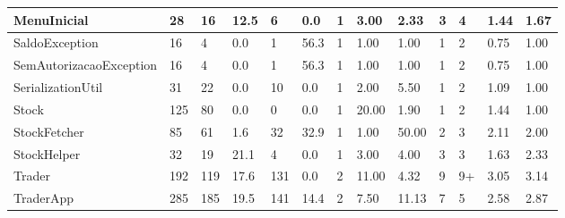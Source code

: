 \begin{table}[ht]
\begin{adjustbox}{width=1\textwidth}
\begin{tabular}{|l|l|l|l|l|l|l|l|l|l|l|l|l|}
MenuInicial                  & 28           & 16         & 12.5            & 6        & 0.0            & 1       & 3.00            & 2.33                       & 3                   & 4                   & 1.44               & 1.67               \\ \hline
SaldoException               & 16           & 4          & 0.0             & 1        & 56.3           & 1       & 1.00            & 1.00                       & 1                   & 2                   & 0.75               & 1.00               \\ \hline
SemAutorizacaoException      & 16           & 4          & 0.0             & 1        & 56.3           & 1       & 1.00            & 1.00                       & 1                   & 2                   & 0.75               & 1.00               \\ \hline
SerializationUtil            & 31           & 22         & 0.0             & 10       & 0.0            & 1       & 2.00            & 5.50                       & 1                   & 2                   & 1.09               & 1.00               \\ \hline
Stock                        & 125          & 80         & 0.0             & 0        & 0.0            & 1       & 20.00           & 1.90                       & 1                   & 2                   & 1.44               & 1.00               \\ \hline
StockFetcher                 & 85           & 61         & 1.6             & 32       & 32.9           & 1       & 1.00            & 50.00                      & 2                   & 3                   & 2.11               & 2.00               \\ \hline
StockHelper                  & 32           & 19         & 21.1            & 4        & 0.0            & 1       & 3.00            & 4.00                       & 3                   & 3                   & 1.63               & 2.33               \\ \hline
Trader                       & 192          & 119        & 17.6            & 131      & 0.0            & 2       & 11.00           & 4.32                       & 9                   & 9+                  & 3.05               & 3.14               \\ \hline
TraderApp                    & 285          & 185        & 19.5            & 141      & 14.4           & 2       & 7.50            & 11.13                      & 7                   & 5                   & 2.58               & 2.87               \\ \hline

\end{tabular}
\end{adjustbox}
\end{table}
